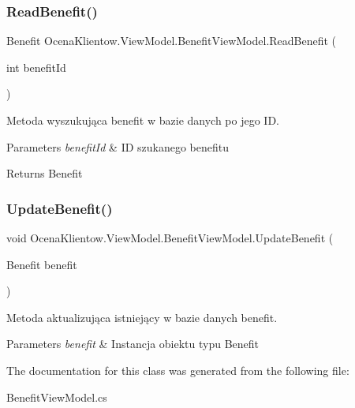 \subsubsection{\texorpdfstring{Read\+Benefit()}{ReadBenefit()}}
{\footnotesize\ttfamily Benefit Ocena\+Klientow.\+View\+Model.\+Benefit\+View\+Model.\+Read\+Benefit (\begin{DoxyParamCaption}\item[{int}]{benefit\+Id }\end{DoxyParamCaption})\hspace{0.3cm}{\ttfamily [inline]}}



Metoda wyszukująca benefit w bazie danych po jego ID. 


\begin{DoxyParams}{Parameters}
{\em benefit\+Id} & ID szukanego benefitu\\
\hline
\end{DoxyParams}
\begin{DoxyReturn}{Returns}
Benefit
\end{DoxyReturn}
\hypertarget{class_ocena_klientow_1_1_view_model_1_1_benefit_view_model_a2b803d785c29c965b8c120064a10d903}{}\label{class_ocena_klientow_1_1_view_model_1_1_benefit_view_model_a2b803d785c29c965b8c120064a10d903} 
\subsubsection{\texorpdfstring{Update\+Benefit()}{UpdateBenefit()}}
{\footnotesize\ttfamily void Ocena\+Klientow.\+View\+Model.\+Benefit\+View\+Model.\+Update\+Benefit (\begin{DoxyParamCaption}\item[{Benefit}]{benefit }\end{DoxyParamCaption})\hspace{0.3cm}{\ttfamily [inline]}}



Metoda aktualizująca istniejący w bazie danych benefit. 


\begin{DoxyParams}{Parameters}
{\em benefit} & Instancja obiektu typu Benefit\\
\hline
\end{DoxyParams}


The documentation for this class was generated from the following file\+:\begin{DoxyCompactItemize}
\item 
Benefit\+View\+Model.\+cs\end{DoxyCompactItemize}
